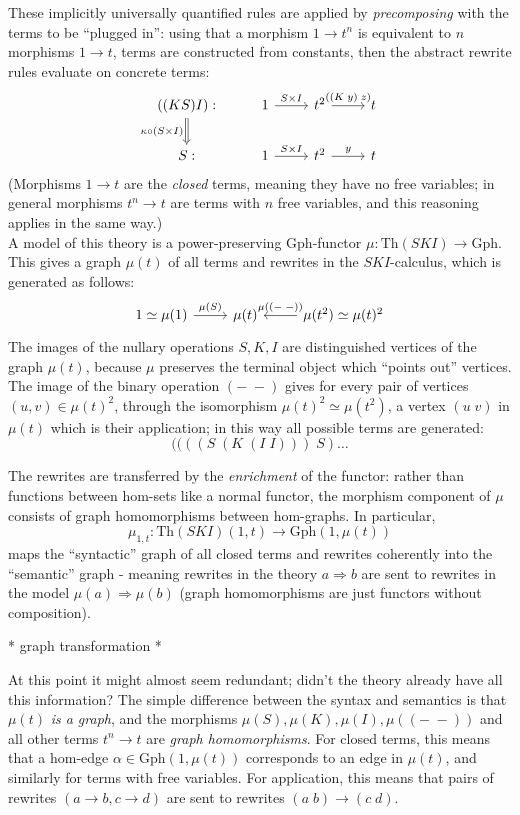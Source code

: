 \documentclass[a4paper,UKenglish]{article}
\theoremstyle{definition}
\newcommand{\Th}{\mathrm{Th}}
\newcommand{\Gph}{\mathrm{Gph}}
\begin{document}
These implicitly universally quantified rules are applied by \textit{precomposing} with the terms to be ``plugged in'': using that a morphism $1 \to t^n$ is equivalent to $n$ morphisms $1 \to t$, terms are constructed from constants, then the abstract rewrite rules evaluate on concrete terms:
\[
\begin{tikzcd}
	((KS)I): \arrow[Rightarrow,d,swap,"\kappa \circ (S\times I)"] & 1 \arrow[r,"S\times I"] & t^2 \arrow[r,"((K\; y)\; z)"] & t\\
	S: & 1 \arrow[r,"S\times I"] & t^2 \arrow[r,"y"] & t
\end{tikzcd}
\]
(Morphisms $1\to t$ are the \textit{closed} terms, meaning they have no free variables; in general morphisms $t^n\to t$ are terms with $n$ free variables, and this reasoning applies in the same way.)\\

A model of this theory is a power-preserving $\Gph$-functor $\mu: \Th(SKI) \to \Gph$. This gives a graph $\mu(t)$ of all terms and rewrites in the $SKI$-calculus, which is generated as follows:
\[
\begin{tikzcd}
1 \simeq \mu(1) \arrow[r,"\mu(S)"] & \mu(t) & \mu(t^2) \arrow[l,swap,"\mu(\left(-\;-\right))"] \simeq \mu(t)^2
\end{tikzcd}
\]
The images of the nullary operations $S,K,I$ are distinguished vertices of the graph $\mu(t)$, because $\mu$ preserves the terminal object which ``points out'' vertices. The image of the binary operation $(-\; -)$ gives for every pair of vertices $(u,v) \in \mu(t)^2$, through the isomorphism $\mu(t)^2 \simeq \mu(t^2)$, a vertex $(u\; v)$ in $\mu(t)$ which is their application; in this way all possible terms are generated: $$((((S\; (K\; (I\; I)))\; S) \dots$$

The rewrites are transferred by the \textit{enrichment} of the functor: rather than functions between hom-sets like a normal functor, the morphism component of $\mu$ consists of graph homomorphisms between hom-graphs. In particular, $$\mu_{1,t}: \Th(SKI)(1,t)\to \Gph(1,\mu(t))$$ maps the ``syntactic'' graph of all closed terms and rewrites coherently into the ``semantic'' graph - meaning rewrites in the theory $a\Rightarrow b$ are sent to rewrites in the model $\mu(a) \Rightarrow \mu(b)$ (graph homomorphisms are just functors without composition).

* graph transformation *

At this point it might almost seem redundant; didn't the theory already have all this information? The simple difference between the syntax and semantics is that $\mu(t)$ \textit{is a graph}, and the morphisms $\mu(S), \mu(K), \mu(I), \mu((-\; -))$ and all other terms $t^n\to t$ are \textit{graph homomorphisms}. For closed terms, this means that a hom-edge $\alpha\in \Gph(1,\mu(t))$ corresponds to an edge in $\mu(t)$, and similarly for terms with free variables. For application, this means that pairs of rewrites $(a\to b, c\to d)$ are sent to rewrites $(a\; b) \to (c\; d)$.
\end{document}
